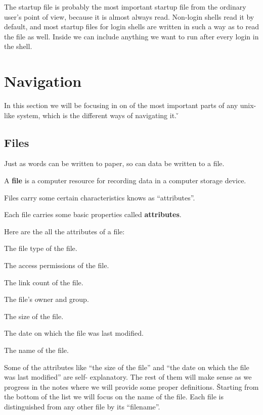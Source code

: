 The  startup file is probably the most important startup file from the ordinary user's point of view,
because it is almost always read. Non-login shells read it by default, and most startup files for login shells are
written in such a way as to read the  file as well. Inside  we can include anything we
want to run after every login in the shell.

\section{Navigation}

In this section we will be focusing in on of the most important parts of any unix-like system, which is the different
ways of navigating it. \v

\subsection{Files}

Just as words can be written to paper, so can data be written to a file.

\bd[File]
A \textbf{file} is a computer resource for recording data in a computer storage device.
\ed

Files carry some certain characteristics knows as ``attributes''.

\bd[Attribute]
Each file carries some basic properties called \textbf{attributes}.
\ed

Here are the all the attributes of a file:
\bit
\item The file type of the file.
\item The access permissions of the file.
\item The link count of the file.
\item The file's owner and group.
\item The size of the file.
\item The date on which the file was last modified.
\item The name of the file.
\eit

Some of the attributes like ``the size of the file'' and ``the date on which the file was last modified'' are self-
explanatory. The rest of them will make sense as we progress in the notes where we will provide some proper definitions.
\v

Starting from the bottom of the list we will focus on the name of the file. Each file is distinguished from any other
file by its ``filename''.


